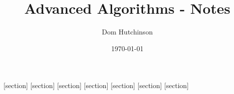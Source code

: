 \documentclass[11pt,a4paper]{article}
\begin{document}
\pagestyle{fancy}
\setlength\parindent{0pt}
\allowdisplaybreaks

\renewcommand{\headrulewidth}{0pt}

\title{Advanced Algorithms - Notes}
\author{Dom Hutchinson}
\date{\today}
\maketitle

\fancyhead[R]{\today}

[section]
[section]
[section]
[section]
[section]
[section]
[section]

\newcommand{\dotprod}[0]{\boldsymbol{\cdot}}
\newcommand{\cosech}[0]{\mathrm{cosech}\ }
\newcommand{\cosec}[0]{\mathrm{cosec}\ }
\newcommand{\sech}[0]{\mathrm{sech}\ }
\newcommand{\prob}[0]{\mathbb{P}}
\newcommand{\nats}[0]{\mathbb{N}}
\newcommand{\cov}[0]{\mathrm{Cov}}
\newcommand{\var}[0]{\mathrm{Var}}
\newcommand{\expect}[0]{\mathbb{E}}
\newcommand{\reals}[0]{\mathbb{R}}
\newcommand{\integers}[0]{\mathbb{Z}}
\newcommand{\indicator}[0]{\mathds{1}}
\newcommand{\nb}[0]{\textit{N.B.} }
\newcommand{\ie}[0]{\textit{i.e.} }
\newcommand{\eg}[0]{\textit{e.g.} }
\newcommand{\X}[0]{\textbf{X}}
\newcommand{\x}[0]{\textbf{x}}
\newcommand{\iid}[0]{\overset{\text{iid}}{\sim}}
\newcommand{\proved}[0]{$\hfill\square$\\}
\newcommand{\Mod}[1]{\ \mathrm{mod}\ #1}
\end{document}
